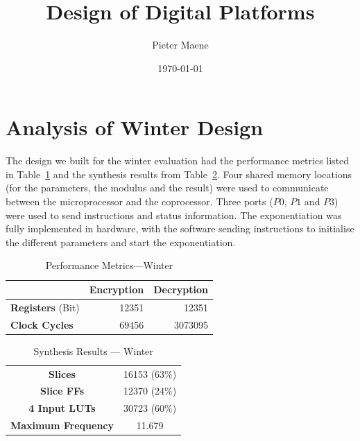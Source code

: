 \documentclass[a4paper]{article}
\title{Design of Digital Platforms}
\author{Pieter Maene}
\date{\today}
\begin{document}
\maketitle

\section{Analysis of Winter Design}

The design we built for the winter evaluation had the performance metrics listed in Table~\ref{tab:performance_metrics_winter} and the synthesis results from Table~\ref{tab:synthesis_results_winter}. Four shared memory locations (for the parameters, the modulus and the result) were used to communicate between the microprocessor and the coprocessor. Three ports ($P0$, $P1$ and $P3$) were used to send instructions and status information. The exponentiation was fully implemented in hardware, with the software sending instructions to initialise the different parameters and start the exponentiation.\\

\begin{table}[H]
	\begin{center}	
		\begin{tabular}{l|r|r}
			 & \textbf{Encryption} & \textbf{Decryption}\\\hline
			\textbf{Registers} (Bit) & 12351 & 12351\\
		 	\textbf{Clock Cycles} & 69456 & 3073095\\
		\end{tabular}
	\end{center}
	\caption{Performance Metrics---Winter}
	\label{tab:performance_metrics_winter}
\end{table}

\begin{table}[H]
	\begin{center}	
		\begin{tabular}{c|c}
			\textbf{Slices} & 16153 (63\%)\\
			\textbf{Slice FFs} & 12370 (24\%)\\
			\textbf{4 Input LUTs} & 30723 (60\%)\\
			\textbf{Maximum Frequency} & 11.679 \mega\hertz
		\end{tabular}
	\end{center}
	\caption{Synthesis Results --- Winter}
	\label{tab:synthesis_results_winter}
\end{table}
\end{document}

